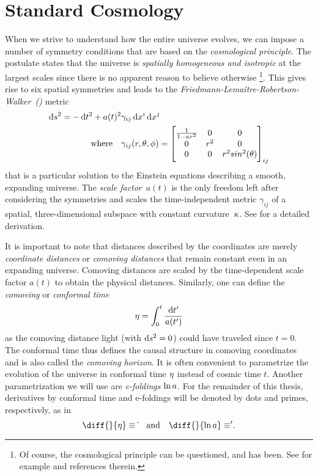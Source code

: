 \documentclass[12pt,parskip=half]{scrreprt}
\begin{document}
\section{Standard \FLRW Cosmology}\label{sec:frw}

When we strive to understand how the entire universe evolves, we can impose a number of symmetry conditions that are based on the \emph{cosmological principle}. The postulate states that the universe is \emph{spatially homogeneous and isotropic} at the largest scales since there is no apparent reason to believe otherwise \footnote{Of course, the cosmological principle can be questioned, and has been. See for example \textcite{Schwarz2015} and references therein.}. This gives rise to six spatial symmetries  and leads to the \emph{Friedmann-Lemaître-Robertson-Walker~(\FLRW)} metric
\begin{subequations}
\begin{align}
	\dif{s}^2 = -\dif{t}^2 + a(t)^2 &\gamma_{ij} \dif{x^i}\dif{x^j} \\
	\text{where} \quad &\gamma_{ij}(r,\theta,\phi) =
	\begin{bmatrix}
		\frac{1}{1-\spatcurv r^2} & 0 & 0 \\
		0 & r^2 & 0 \\
		0 & 0 & r^2 sin^2(\theta)
	\end{bmatrix}_{ij}
\end{align}
\end{subequations}
that is a particular solution to the Einstein equations describing a smooth, expanding universe. The \emph{scale factor}~\(a(t)\) is the only freedom left after considering the symmetries and scales the time-independent metric \(\gamma_{ij}\) of a spatial, three-dimensional subspace with constant curvature~\(\kappa\). See  for a detailed derivation.

It is important to note that distances described by the \FLRW coordinates are merely \emph{coordinate distances} or \emph{comoving distances} that remain constant even in an expanding universe. Comoving distances are scaled by the time-dependent scale factor \(a(t)\) to obtain the physical distances. Similarly, one can define the \emph{comoving} or \emph{conformal time}
\begin{equation}
	\conft = \int_0^t \frac{\dif{t^\prime}}{a(t^\prime)}
\end{equation}
as the comoving distance light (with \(\dif{s}^2=0\)) could have traveled since \(t=0\). The conformal time thus defines the causal structure in comoving coordinates and is also called the \emph{comoving horizon}. It is often convenient to parametrize the evolution of the universe in conformal time \(\eta\) instead of cosmic time \(t\). Another parametrization we will use are \emph{e-foldings} \(\ln a\). For the remainder of this thesis, derivatives by conformal time and e-foldings will be denoted by dots and primes, respectively, as in
\begin{equation}
	\diff{}{\conft}\equiv\dconf{} \quad \text{and} \quad \diff{}{\efold}\equiv\defold{}
	\eqpunct{.}
\end{equation}
\end{document}
